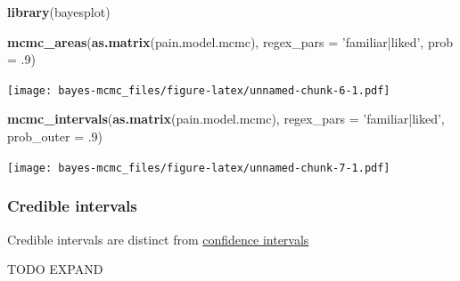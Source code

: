 \documentclass[]{article}
\newenvironment{Shaded}{\begin{snugshade}}{\end{snugshade}}
\newcommand{\KeywordTok}[1]{\textcolor[rgb]{0.13,0.29,0.53}{\textbf{#1}}}
\newcommand{\DataTypeTok}[1]{\textcolor[rgb]{0.13,0.29,0.53}{#1}}
\newcommand{\DecValTok}[1]{\textcolor[rgb]{0.00,0.00,0.81}{#1}}
\newcommand{\StringTok}[1]{\textcolor[rgb]{0.31,0.60,0.02}{#1}}
\newcommand{\NormalTok}[1]{#1}
\theoremstyle{definition}
\theoremstyle{definition}
\theoremstyle{definition}
\theoremstyle{remark}
\begin{document}
\begin{Shaded}
\begin{Highlighting}[]
\KeywordTok{library}\NormalTok{(bayesplot)}

\KeywordTok{mcmc_areas}\NormalTok{(}\KeywordTok{as.matrix}\NormalTok{(pain.model.mcmc), }\DataTypeTok{regex_pars =} \StringTok{'familiar|liked'}\NormalTok{, }\DataTypeTok{prob =}\NormalTok{ .}\DecValTok{9}\NormalTok{)}
\end{Highlighting}
\end{Shaded}

\texttt{[image: bayes-mcmc\_files/figure-latex/unnamed-chunk-6-1.pdf]}

\begin{Shaded}
\begin{Highlighting}[]
\KeywordTok{mcmc_intervals}\NormalTok{(}\KeywordTok{as.matrix}\NormalTok{(pain.model.mcmc), }\DataTypeTok{regex_pars =} \StringTok{'familiar|liked'}\NormalTok{, }\DataTypeTok{prob_outer =}\NormalTok{ .}\DecValTok{9}\NormalTok{)}
\end{Highlighting}
\end{Shaded}

\texttt{[image: bayes-mcmc\_files/figure-latex/unnamed-chunk-7-1.pdf]}

\subsubsection*{Credible intervals}\label{credible-intervals}

Credible intervals are distinct from
\protect\hyperlink{intervals}{confidence intervals}

TODO EXPAND
\end{document}
